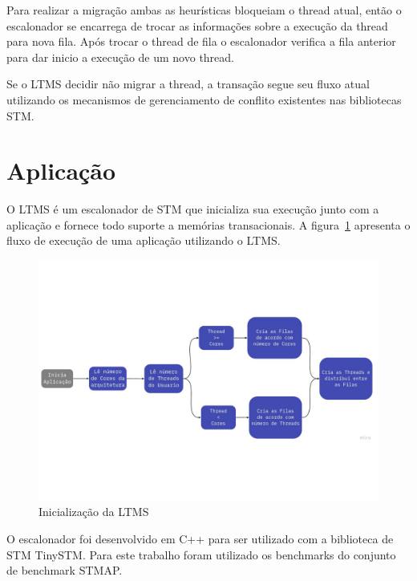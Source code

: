 \documentclass[diss,capa]{texufpel}
\begin{document}
Para realizar a migração ambas as heurísticas bloqueiam o thread atual, então o escalonador se encarrega de trocar as informações sobre a execução da thread para nova fila. Após trocar o thread de fila o escalonador verifica a fila anterior para dar inicio a execução de um novo thread.

Se o LTMS decidir não migrar a thread, a transação segue seu fluxo atual utilizando os mecanismos de gerenciamento de conflito existentes nas bibliotecas STM.

\section{\textbf{Aplicação}}

O LTMS é um escalonador de STM que inicializa sua execução junto com a aplicação e fornece todo suporte a memórias transacionais. A figura~\ref{LTMS1} apresenta o fluxo de execução de uma aplicação utilizando o LTMS.

\begin{figure}[htbp]
  \centering \includegraphics[scale=.5]{images/lstm1}
\caption{Inicialização da LTMS} 
\label{LTMS1}
\end{figure}

O escalonador foi desenvolvido em C++ para ser utilizado com a biblioteca de STM TinySTM. Para este trabalho foram utilizado os benchmarks do conjunto de benchmark STMAP.

\end{document}
